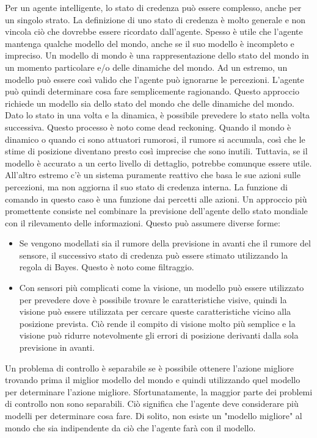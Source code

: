 \documentclass[a4paper]{extarticle}
\begin{document}
Per un agente intelligente, lo stato di credenza può essere complesso, anche per un singolo strato. La definizione di uno stato di credenza è molto generale e non vincola ciò che dovrebbe essere ricordato dall'agente. Spesso è utile che l'agente mantenga qualche modello del mondo, anche se il suo modello è incompleto e impreciso. Un modello di mondo è una rappresentazione dello stato del mondo in un momento particolare e/o delle dinamiche del mondo. Ad un estremo, un modello può essere così valido che l'agente può ignorarne le percezioni. L'agente può quindi determinare cosa fare semplicemente ragionando. Questo approccio richiede un modello sia dello stato del mondo che delle dinamiche del mondo. Dato lo stato in una volta e la dinamica, è possibile prevedere lo stato nella volta successiva. Questo processo è noto come dead reckoning.  Quando il mondo è dinamico o quando ci sono attuatori rumorosi, il rumore si accumula, così che le stime di posizione diventano presto così imprecise che sono inutili. Tuttavia, se il modello è accurato a un certo livello di dettaglio, potrebbe comunque essere utile. All'altro estremo c'è un sistema puramente reattivo che basa le sue azioni sulle percezioni, ma non aggiorna il suo stato di credenza interna. La funzione di comando in questo caso è una funzione dai percetti alle azioni. Un approccio più promettente consiste nel combinare la previsione dell'agente dello stato mondiale con il rilevamento delle informazioni. Questo può assumere diverse forme:
\begin{itemize}
\item Se vengono modellati sia il rumore della previsione in avanti che il rumore del sensore, il successivo stato di credenza può essere stimato utilizzando la regola di Bayes. Questo è noto come filtraggio.
\item Con sensori più complicati come la visione, un modello può essere utilizzato per prevedere dove è possibile trovare le caratteristiche visive, quindi la visione può essere utilizzata per cercare queste caratteristiche vicino alla posizione prevista. Ciò rende il compito di visione molto più semplice e la visione può ridurre notevolmente gli errori di posizione derivanti dalla sola previsione in avanti.
\end{itemize}
Un problema di controllo è separabile se è possibile ottenere l'azione migliore trovando prima il miglior modello del mondo e quindi utilizzando quel modello per determinare l'azione migliore. Sfortunatamente, la maggior parte dei problemi di controllo non sono separabili. Ciò significa che l'agente deve considerare più modelli per determinare cosa fare. Di solito, non esiste un "modello migliore" al mondo che sia indipendente da ciò che l'agente farà con il modello.
\end{document}
